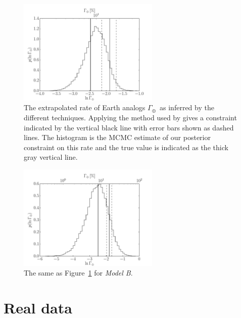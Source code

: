 \documentclass[12pt,preprint]{aastex}
\newcommand{\Fig}[1]{Figure~\ref{fig:#1}}
\newcommand{\fig}[1]{\Fig{#1}}
\newcommand{\figlabel}[1]{\label{fig:#1}}
\newcommand{\rate}{\ensuremath{\Gamma}}
\newcommand{\modelb}{\emph{Model B}}
\newcommand{\gammaearth}{{\ensuremath{\rate_\oplus}}}
\begin{document}
\begin{figure}[p]
\begin{center}
\includegraphics[width=0.6\textwidth]{figures/smooth/rate.pdf}
\end{center}
\caption{%
The extrapolated rate of Earth analogs \gammaearth\ as inferred by the
different techniques.
Applying the method used by \citet{petigura} gives a constraint indicated by
the vertical black line with error bars shown as dashed lines.
The histogram is the MCMC estimate of our posterior constraint on this rate
and the true value is indicated as the thick gray vertical line.
\figlabel{smooth-rate}}
\end{figure}

\begin{figure}[p]
\begin{center}
\includegraphics[width=0.6\textwidth]{figures/simulation/rate.pdf}
\end{center}
\caption{%
The same as \fig{smooth-rate} for \modelb.
\figlabel{simulation-rate}}
\end{figure}

\section{Real data}
\end{document}
